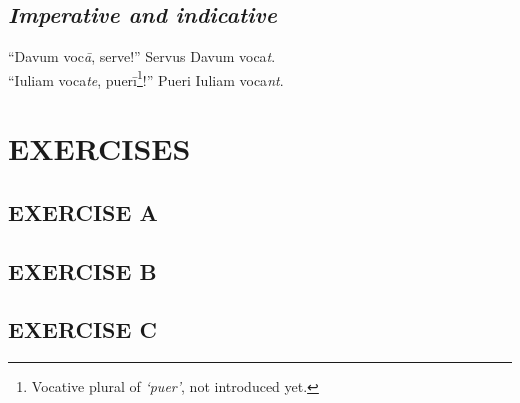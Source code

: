 \subsection{\emph{Imperative and indicative}}
``Davum voc\emph{\=a}, serve!'' Servus Davum voca\emph{t}.\\
``Iuliam voca\emph{te}, puer\=i\footnote{Vocative plural of \emph{`puer'}, not introduced yet.}!'' Pueri Iuliam voca\emph{nt}.

\nolinenumbers

\section[Exercises]{EXERCISES}
\subsection*{EXERCISE A}

\subsection*{EXERCISE B}

\subsection*{EXERCISE C}
